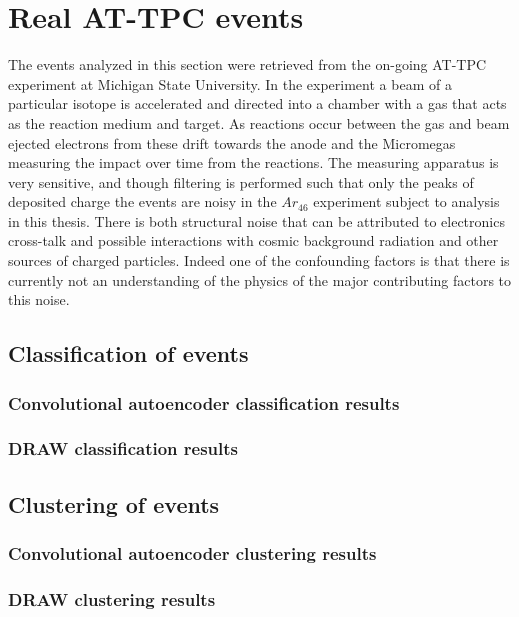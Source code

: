 \section{Real AT-TPC events}
The events analyzed in this section were retrieved from the on-going AT-TPC experiment at Michigan State University. In the experiment a beam of a particular isotope is accelerated and directed into a chamber with a gas that acts as the reaction medium and target. As reactions occur between the gas and beam ejected electrons from these drift towards the anode and the Micromegas measuring the impact over time from the reactions. The measuring apparatus is very sensitive, and though filtering is performed such that only the peaks of deposited charge the events are noisy in the $Ar_{46}$ experiment subject to analysis in this thesis. There is both structural noise that can be attributed to electronics cross-talk and possible interactions with cosmic background radiation and other sources of charged particles. Indeed one of the confounding factors is that there is currently not an understanding of the physics of the major contributing factors to this noise. 

\subsection{Classification of events} 
\subsubsection{Convolutional autoencoder classification results}
\subsubsection{DRAW classification results}
\subsection{Clustering of events}
\subsubsection{Convolutional autoencoder clustering results}
\subsubsection{DRAW clustering results}